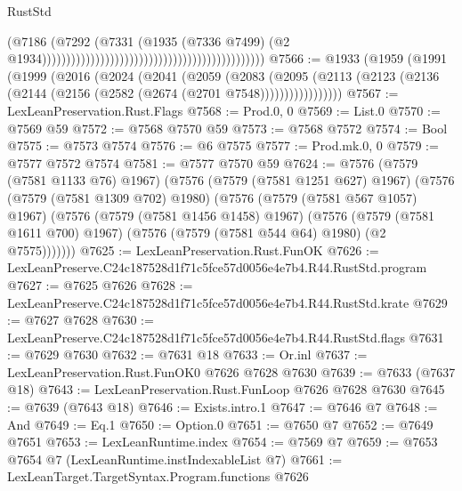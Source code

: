 \begin{lexlean}{RustStd}
\begin{coremodule}
                                                                                      (@7186
                                                                                        (@7292
                                                                                          (@7331
                                                                                            (@1935
                                                                                              (@7336
                                                                                                @7499)
                                                                                              (@2
                                                                                                @1934))))))))))))))))))))))))))))))))))))))))))))))
@7566 := @1933
    (@1959
      (@1991
        (@1999
          (@2016
            (@2024
              (@2041
                (@2059
                  (@2083
                    (@2095
                      (@2113 (@2123 (@2136 (@2144 (@2156 (@2582 (@2674 (@2701 @7548)))))))))))))))))
@7567 := LexLeanPreservation.Rust.Flags
@7568 := Prod.{0, 0}
@7569 := List.{0}
@7570 := @7569 @59
@7572 := @7568 @7570 @59
@7573 := @7568 @7572
@7574 := Bool
@7575 := @7573 @7574
@7576 := @6 @7575
@7577 := Prod.mk.{0, 0}
@7579 := @7577 @7572 @7574
@7581 := @7577 @7570 @59
@7624 := @7576
    (@7579 (@7581 @1133 @76) @1967)
    (@7576
      (@7579 (@7581 @1251 @627) @1967)
      (@7576
        (@7579 (@7581 @1309 @702) @1980)
        (@7576
          (@7579 (@7581 @567 @1057) @1967)
          (@7576
            (@7579 (@7581 @1456 @1458) @1967)
            (@7576
              (@7579 (@7581 @1611 @700) @1967)
              (@7576 (@7579 (@7581 @544 @64) @1980) (@2 @7575)))))))
@7625 := LexLeanPreservation.Rust.FunOK
@7626 := LexLeanPreserve.C24c187528d1f71c5fce57d0056e4e7b4.R44.RustStd.program
@7627 := @7625 @7626
@7628 := LexLeanPreserve.C24c187528d1f71c5fce57d0056e4e7b4.R44.RustStd.krate
@7629 := @7627 @7628
@7630 := LexLeanPreserve.C24c187528d1f71c5fce57d0056e4e7b4.R44.RustStd.flags
@7631 := @7629 @7630
@7632 := @7631 @18
@7633 := Or.inl
@7637 := LexLeanPreservation.Rust.FunOK0 @7626 @7628 @7630
@7639 := @7633 (@7637 @18)
@7643 := LexLeanPreservation.Rust.FunLoop @7626 @7628 @7630
@7645 := @7639 (@7643 @18)
@7646 := Exists.intro.{1}
@7647 := @7646 @7
@7648 := And
@7649 := Eq.{1}
@7650 := Option.{0}
@7651 := @7650 @7
@7652 := @7649 @7651
@7653 := LexLeanRuntime.index
@7654 := @7569 @7
@7659 := @7653 @7654 @7 (LexLeanRuntime.instIndexableList @7)
@7661 := LexLeanTarget.TargetSyntax.Program.functions @7626

\end{coremodule}
\end{lexlean}
